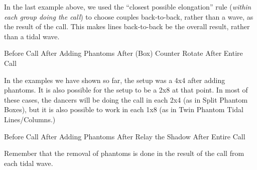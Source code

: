 \documentclass[12pt]{article}
\begin{document}
In the last example above, we used the ``closest possible elongation'' rule
(\emph{within each group doing the call}) to choose couples back-to-back,
rather than a wave, as the result of the call.
This makes lines back-to-back be the overall result,
rather than a tidal wave.

\displaytwo
{\cr
 }
{Before Call}
{\cr
 \cr
 \cr
 }
{After Adding Phantoms}
\displaytwo
{\cr
 \cr
 \cr
 }
{After (Box) Counter Rotate}
{\cr
 }
{After Entire Call}
\endexample

In the examples we have shown so far, the setup was a 4x4
after adding phantoms.  It is also possible for the setup
to be a 2x8 at that point.
In most of these cases, the dancers will be doing the call
in each 2x4 (as in Split Phantom Boxes),
but it is also possible to work in each 1x8
(as in Twin Phantom Tidal Lines/Columns.)

\displaytwo
{\cr
 }
{Before Call}
{\cr
 }
{After Adding Phantoms}
\displaytwo
{\cr
 \cr
 \cr
 }
{After Relay the Shadow}
{\cr
 \cr
 \cr
 }
{After Entire Call}
\endexample

Remember that the removal of phantoms is done in the result of the call
from each tidal wave.
\end{document}

